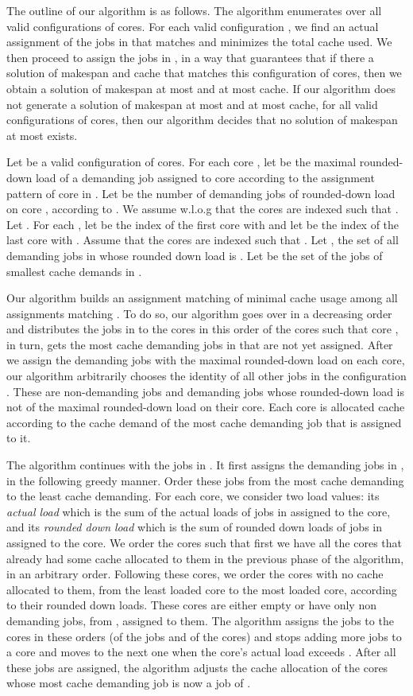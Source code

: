 \documentclass[11pt]{article}
\begin{document}
The outline of our algorithm is as follows.
The algorithm enumerates over all valid configurations of cores.
For each valid configuration , we find an actual assignment of the jobs in  that matches  and minimizes the total cache used.
We then proceed to assign the jobs in , in a way that guarantees that if there a solution of makespan  and  cache that matches this configuration of cores, then we obtain a solution of makespan at most  and at most  cache. If our algorithm does not generate a solution of makespan at most  and at most  cache, for all valid configurations of cores, then our algorithm decides that no solution of makespan at most  exists.

Let  be a valid configuration of cores.
For each core , let  be the maximal rounded-down load of a demanding job assigned to core  according to the assignment pattern of core  in .
Let  be the number of demanding jobs of rounded-down load  on core , according to .
We assume w.l.o.g that the cores are indexed such that .
Let .
For each , let  be the index of the first core  with  and let  be the index of the last core  with .
Assume that the cores  are indexed such that .
Let , the set of all demanding jobs in  whose rounded down load is .
Let  be the set of the  jobs of smallest cache demands in .

Our algorithm builds an assignment matching  of minimal cache usage among all assignments matching .
To do so, our algorithm goes over  in a decreasing order and distributes the jobs in  to the cores  in this order of the cores such that core , in turn, gets the  most cache demanding jobs in  that are not yet assigned.
After we assign the demanding jobs with the maximal rounded-down load on each core, our algorithm arbitrarily chooses the identity of all other jobs in the configuration .
These are non-demanding jobs and demanding jobs whose rounded-down load is not of the maximal rounded-down load on their core.
Each core is allocated cache according to the cache demand of the most cache demanding job that is assigned to it.


The algorithm continues with the jobs in . It first assigns the
demanding jobs in , in the following greedy manner. Order these
jobs from the most cache demanding to the least cache demanding. For
each core, we consider two load values: its \textit{actual load}
which is the sum of the actual loads of jobs in  assigned to
the core, and its \textit{rounded down load} which is the sum of
rounded down loads of jobs in  assigned to the core. We order
the cores such that first we have all the cores that already had
some cache allocated to them in the previous phase of the algorithm,
in an arbitrary order. Following these cores, we order the cores
with no cache allocated to them, from the least loaded core to the
most loaded core, according to their rounded down loads. These cores
are either empty or have only non demanding jobs, from ,
assigned to them. The algorithm assigns the jobs to the cores in
these orders (of the jobs and of the cores) and stops adding more
jobs to a core and moves to the next one when the core's actual load
exceeds . After all these jobs are assigned, the
algorithm adjusts the cache allocation of the cores whose most cache
demanding job is now a job of .
\end{document}
